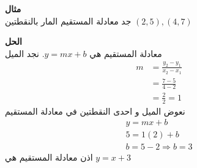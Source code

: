 \noindent
\textbf{مثال}\\
\noindent
جد معادلة المستقيم المار بالنقطتين $(2, 5), (4, 7)$

\noindent
\textbf{الحل}\\
\noindent
معادلة المستقيم هي $y = mx + b$. نجد الميل
\begin{align*}
	m &= \frac{y_2-y_1}{x_2-x_1}\\
	&= \frac{7-5}{4-2}\\
	&= \frac{2}{2}=1
\end{align*}
نعوض الميل و احدى النقطتين في معادلة المستقيم
\begin{gather*}
y = mx + b\\
5 = 1(2) + b\\
b = 5-2 \Rightarrow b=3
\end{gather*}
اذن معادلة المستقيم هي $ y = x+3 $ 
